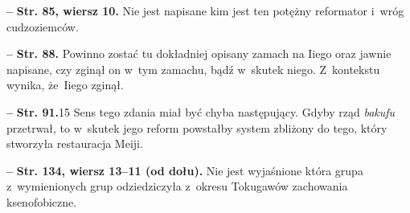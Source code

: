 \documentclass[a4paper,11pt]{article}
\newcommand{\spaceFour}{0.5em}
\newcommand{\tb}{\textbf}
\newcommand{\noi}{\noindent}
\newcommand{\start}{\noi \tb{--} {}}
\newcommand{\Str}[1]{\tb{Str. #1.}}
\newcommand{\StrWg}[2]{\tb{Str. #1, wiersz #2.}}
\newcommand{\StrWd}[2]{\tb{Str. #1, wiersz #2 (od dołu).}}
\begin{document}
\vspace{\spaceFour}


\start \StrWg{85}{10} Nie jest napisane kim jest ten potężny
reformator i~wróg cudzoziemców.

\vspace{\spaceFour}


\start \Str{88} Powinno zostać tu dokładniej opisany zamach na Iiego
oraz jawnie napisane, czy zginął on w~tym zamachu, bądź w~skutek
niego. Z~kontekstu wynika, że~Iiego zginął.

\vspace{\spaceFour}


\start \Str{91}{15} Sens tego zdania miał być chyba następujący. Gdyby
rząd \emph{bakufu} przetrwał, to w~skutek jego reform powstałby system
zbliżony do tego, który stworzyła restauracja Meiji.

\vspace{\spaceFour}


\start \StrWd{134}{13--11} Nie jest wyjaśnione która grupa
z~wymienionych grup odziedziczyła z~okresu Tokugawów zachowania
ksenofobiczne.
\end{document}
